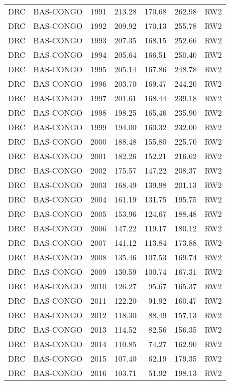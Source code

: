 \begin{longtable}{lllrrrl}
  DRC & BAS-CONGO & 1991 & 213.28 & 170.68 & 262.98 & RW2 \\ 
  DRC & BAS-CONGO & 1992 & 209.92 & 170.13 & 255.78 & RW2 \\ 
  DRC & BAS-CONGO & 1993 & 207.35 & 168.15 & 252.66 & RW2 \\ 
  DRC & BAS-CONGO & 1994 & 205.64 & 166.51 & 250.40 & RW2 \\ 
  DRC & BAS-CONGO & 1995 & 205.14 & 167.86 & 248.78 & RW2 \\ 
  DRC & BAS-CONGO & 1996 & 203.70 & 169.47 & 244.20 & RW2 \\ 
  DRC & BAS-CONGO & 1997 & 201.61 & 168.44 & 239.18 & RW2 \\ 
  DRC & BAS-CONGO & 1998 & 198.25 & 165.46 & 235.90 & RW2 \\ 
  DRC & BAS-CONGO & 1999 & 194.00 & 160.32 & 232.00 & RW2 \\ 
  DRC & BAS-CONGO & 2000 & 188.48 & 155.80 & 225.70 & RW2 \\ 
  DRC & BAS-CONGO & 2001 & 182.26 & 152.21 & 216.62 & RW2 \\ 
  DRC & BAS-CONGO & 2002 & 175.57 & 147.22 & 208.37 & RW2 \\ 
  DRC & BAS-CONGO & 2003 & 168.49 & 139.98 & 201.13 & RW2 \\ 
  DRC & BAS-CONGO & 2004 & 161.19 & 131.75 & 195.75 & RW2 \\ 
  DRC & BAS-CONGO & 2005 & 153.96 & 124.67 & 188.48 & RW2 \\ 
  DRC & BAS-CONGO & 2006 & 147.22 & 119.17 & 180.12 & RW2 \\ 
  DRC & BAS-CONGO & 2007 & 141.12 & 113.84 & 173.88 & RW2 \\ 
  DRC & BAS-CONGO & 2008 & 135.46 & 107.53 & 169.74 & RW2 \\ 
  DRC & BAS-CONGO & 2009 & 130.59 & 100.74 & 167.31 & RW2 \\ 
  DRC & BAS-CONGO & 2010 & 126.27 & 95.67 & 165.37 & RW2 \\ 
  DRC & BAS-CONGO & 2011 & 122.20 & 91.92 & 160.47 & RW2 \\ 
  DRC & BAS-CONGO & 2012 & 118.30 & 88.49 & 157.13 & RW2 \\ 
  DRC & BAS-CONGO & 2013 & 114.52 & 82.56 & 156.35 & RW2 \\ 
  DRC & BAS-CONGO & 2014 & 110.85 & 74.27 & 162.90 & RW2 \\ 
  DRC & BAS-CONGO & 2015 & 107.40 & 62.19 & 179.35 & RW2 \\ 
  DRC & BAS-CONGO & 2016 & 103.71 & 51.92 & 198.13 & RW2 \\ 

\end{longtable}
